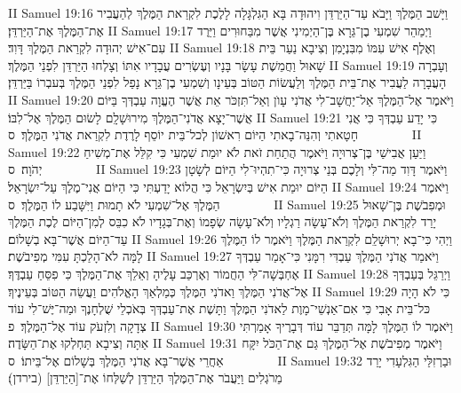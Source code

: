 II Samuel 19:16	וַיָּשׁב הַמֶּלֶךְ וַיָּבֹא עַד־הַיַּרְדֵּן וִיהוּדָה בָּא הַגִּלְגָּלָה לָלֶכֶת לִקְרַאת הַמֶּלֶךְ לְהַעֲבִיר אֶת־הַמֶּלֶךְ אֶת־הַיַּרְדֵּן׃
II Samuel 19:17	וַיְמַהֵר שִׁמְעִי בֶן־גֵּרָא בֶּן־הַיְמִינִי אֲשֶׁר מִבַּחוּרִים וַיֵּרֶד עִם־אִישׁ יְהוּדָה לִקְרַאת הַמֶּלֶךְ דָּוִד׃
II Samuel 19:18	וְאֶלֶף אִישׁ עִמּוֹ מִבִּנְיָמִן וְצִיבָא נַעַר בֵּית שָׁאוּל וַחֲמֵשֶׁת עָשָׂר בָּנָיו וְעֶשְׂרִים עֲבָדָיו אִתּוֹ וְצָלְחוּ הַיַּרְדֵּן לִפְנֵי הַמֶּלֶךְ׃
II Samuel 19:19	וְעָבְרָה הָעֲבָרָה לַעֲבִיר אֶת־בֵּית הַמֶּלֶךְ וְלַעֲשׂוֹת הַטּוֹב בְּעֵינָו וְשִׁמְעִי בֶן־גֵּרָא נָפַל לִפְנֵי הַמֶּלֶךְ בְּעבְרוֹ בַּיַּרְדֵּן׃
II Samuel 19:20	וַיֹּאמֶר אֶל־הַמֶּלֶךְ אַל־יַחֲשָׁב־לִי אֲדֹנִי עָוֺן וְאַל־תִּזְכֹּר אֵת אֲשֶׁר הֶעֱוָה עַבְדְּךָ בַּיּוֹם אֲשֶׁר־יָצָא אֲדֹנִי־הַמֶּלֶךְ מִירוּשָׁלָ͏ִם לָשׂוּם הַמֶּלֶךְ אֶל־לִבּוֹ׃
II Samuel 19:21	כִּי יָדַע עַבְדְּךָ כִּי אֲנִי חָטָאתִי וְהִנֵּה־בָאתִי הַיּוֹם רִאשׁוֹן לְכל־בֵּית יוֹסֵף לָרֶדֶת לִקְרַאת אֲדֹנִי הַמֶּלֶךְ׃ {ס}        
II Samuel 19:22	וַיַּעַן אֲבִישַׁי בֶּן־צְרוּיָה וַיֹּאמֶר הֲתַחַת זֹאת לֹא יוּמַת שִׁמְעִי כִּי קִלֵּל אֶת־מְשִׁיחַ יְהֹוָה׃ {ס}        
II Samuel 19:23	וַיֹּאמֶר דָּוִד מַה־לִּי וְלָכֶם בְּנֵי צְרוּיָה כִּי־תִהְיוּ־לִי הַיּוֹם לְשָׂטָן הַיּוֹם יוּמַת אִישׁ בְּיִשְׂרָאֵל כִּי הֲלוֹא יָדַעְתִּי כִּי הַיּוֹם אֲנִי־מֶלֶךְ עַל־יִשְׂרָאֵל׃
II Samuel 19:24	וַיֹּאמֶר הַמֶּלֶךְ אֶל־שִׁמְעִי לֹא תָמוּת וַיִּשָּׁבַע לוֹ הַמֶּלֶךְ׃ {ס}        
II Samuel 19:25	וּמְפִבֹשֶׁת בֶּן־שָׁאוּל יָרַד לִקְרַאת הַמֶּלֶךְ וְלֹא־עָשָׂה רַגְלָיו וְלֹא־עָשָׂה שְׂפָמוֹ וְאֶת־בְּגָדָיו לֹא כִבֵּס לְמִן־הַיּוֹם לֶכֶת הַמֶּלֶךְ עַד־הַיּוֹם אֲשֶׁר־בָּא בְשָׁלוֹם׃
II Samuel 19:26	וַיְהִי כִּי־בָא יְרוּשָׁלַ͏ִם לִקְרַאת הַמֶּלֶךְ וַיֹּאמֶר לוֹ הַמֶּלֶךְ לָמָּה לֹא־הָלַכְתָּ עִמִּי מְפִיבֹשֶׁת׃
II Samuel 19:27	וַיֹּאמַר אֲדֹנִי הַמֶּלֶךְ עַבְדִּי רִמָּנִי כִּי־אָמַר עַבְדְּךָ אֶחְבְּשָׁה־לִּי הַחֲמוֹר וְאֶרְכַּב עָלֶיהָ וְאֵלֵךְ אֶת־הַמֶּלֶךְ כִּי פִסֵּחַ עַבְדֶּךָ׃
II Samuel 19:28	וַיְרַגֵּל בְּעַבְדְּךָ אֶל־אֲדֹנִי הַמֶּלֶךְ וַאדֹנִי הַמֶּלֶךְ כְּמַלְאַךְ הָאֱלֹהִים וַעֲשֵׂה הַטּוֹב בְּעֵינֶיךָ׃
II Samuel 19:29	כִּי לֹא הָיָה כּל־בֵּית אָבִי כִּי אִם־אַנְשֵׁי־מָוֶת לַאדֹנִי הַמֶּלֶךְ וַתָּשֶׁת אֶת־עַבְדְּךָ בְּאֹכְלֵי שֻׁלְחָנֶךָ וּמַה־יֶּשׁ־לִי עוֹד צְדָקָה וְלִזְעֹק עוֹד אֶל־הַמֶּלֶךְ׃ {פ}
II Samuel 19:30	וַיֹּאמֶר לוֹ הַמֶּלֶךְ לָמָּה תְּדַבֵּר עוֹד דְּבָרֶיךָ אָמַרְתִּי אַתָּה וְצִיבָא תַּחְלְקוּ אֶת־הַשָּׂדֶה׃
II Samuel 19:31	וַיֹּאמֶר מְפִיבֹשֶׁת אֶל־הַמֶּלֶךְ גַּם אֶת־הַכֹּל יִקָּח אַחֲרֵי אֲשֶׁר־בָּא אֲדֹנִי הַמֶּלֶךְ בְּשָׁלוֹם אֶל־בֵּיתוֹ׃ {ס}        
II Samuel 19:32	וּבַרְזִלַּי הַגִּלְעָדִי יָרַד מֵרֹגְלִים וַיַּעֲבֹר אֶת־הַמֶּלֶךְ הַיַּרְדֵּן לְשַׁלְּחוֹ אֶת־[הַיַּרְדֵּן] (בירדן)׃
